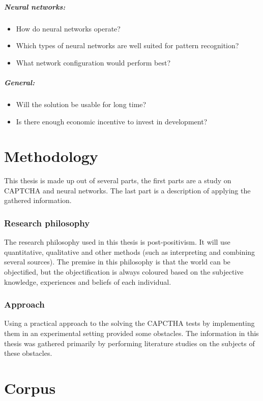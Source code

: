 \documentclass[pdftex,a4paper,12pt,twoside]{report}
\theoremstyle{plain} \newtheorem{theorem}{Theorem} \newtheorem{proposition}{Proposition} \newtheorem{lemma}{Lemma} \newtheorem*{corollary}{Corollary}
\theoremstyle{definition} \newtheorem{definition}{Definition} \newtheorem{conjecture}{Conjecture} \newtheorem*{example}{Example} \newtheorem{algorithm}{Algorithm}
\theoremstyle{remark} \newtheorem*{remark}{Remark} \newtheorem*{note}{Note} \newtheorem{case}{Case}
\begin{document}
\paragraph{Neural networks:}
\begin{itemize}
\item How do neural networks operate?
\item Which types of neural networks are well suited for pattern recognition?
\item What network configuration would perform best?
\end{itemize}
\paragraph{General:}
\begin{itemize}
\item Will the solution be usable for long time?
\item Is there enough economic incentive to invest in development?
\end{itemize}
\cleardoublepage
\chapter{Methodology}
\label{ch:methodology}
This thesis is made up out of several parts, the first parts are a study on CAPTCHA and neural networks. The last part is a description of applying the gathered information.
\subsection{Research philosophy}
The research philosophy used in this thesis is post-positivism. It will use quantitative, qualitative and other methods (such as interpreting and combining several sources). The premise in this philosophy is that the world can be objectified, but the objectification is always coloured based on the subjective knowledge, experiences and beliefs of each individual.
\subsection{Approach}
Using a practical approach to the solving the CAPCTHA tests by implementing them in an experimental setting provided some obstacles. The information in this thesis was gathered primarily by performing literature studies on the subjects of these obstacles.
\cleardoublepage
\chapter{Corpus}
\label{ch:corpus}
\end{document}

